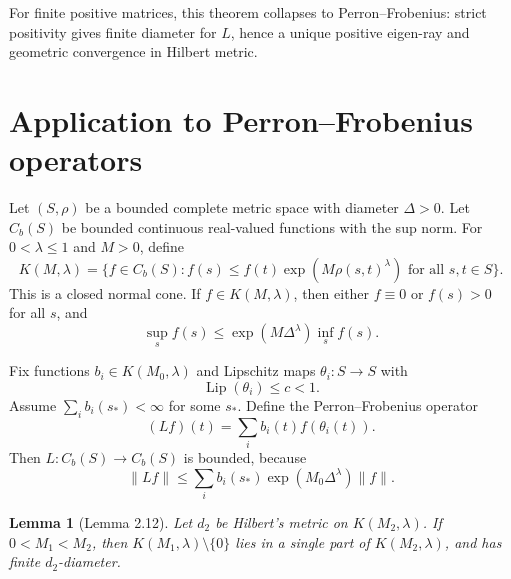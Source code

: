 \documentclass[11pt]{article}
\newtheorem{lemma}{Lemma}
\begin{document}
For finite positive matrices, this theorem collapses to Perron--Frobenius: strict positivity gives finite diameter for \(L\), hence a unique positive eigen-ray and geometric convergence in Hilbert metric.

\section{Application to Perron--Frobenius operators}
Let \((S,\rho)\) be a bounded complete metric space with diameter \(\Delta>0\).  Let \(C_b(S)\) be bounded continuous real-valued functions with the sup norm.  For \(0<\lambda\le1\) and \(M>0\), define
\begin{equation}
  K(M,\lambda)=\{f\in C_b(S): f(s)\le f(t)\exp(M\rho(s,t)^\lambda)\text{ for all }s,t\in S\}.
  \label{eq:holder-cone}
\end{equation}
This is a closed normal cone.  If \(f\in K(M,\lambda)\), then either \(f\equiv0\) or \(f(s)>0\) for all \(s\), and
\begin{equation}
  \sup_s f(s)\le \exp(M\Delta^\lambda)\inf_s f(s).
  \label{eq:holder-cone-sup-inf}
\end{equation}

Fix functions \(b_i\in K(M_0,\lambda)\) and Lipschitz maps \(\theta_i:S\to S\) with
\[
  \operatorname{Lip}(\theta_i)\le c<1.
\]
Assume \(\sum_i b_i(s_*)<\infty\) for some \(s_*\).  Define the Perron--Frobenius operator
\begin{equation}
  (Lf)(t)=\sum_i b_i(t)f(\theta_i(t)).
  \label{eq:LN-PF-operator}
\end{equation}
Then \(L:C_b(S)\to C_b(S)\) is bounded, because
\[
  \|Lf\|\le \sum_i b_i(s_*)\exp(M_0\Delta^\lambda)\|f\|.
\]

\begin{lemma}[Lemma 2.12]
Let \(d_2\) be Hilbert's metric on \(K(M_2,\lambda)\).  If \(0<M_1<M_2\), then \(K(M_1,\lambda)\setminus\{0\}\) lies in a single part of \(K(M_2,\lambda)\), and has finite \(d_2\)-diameter.
\end{lemma}
\end{document}
